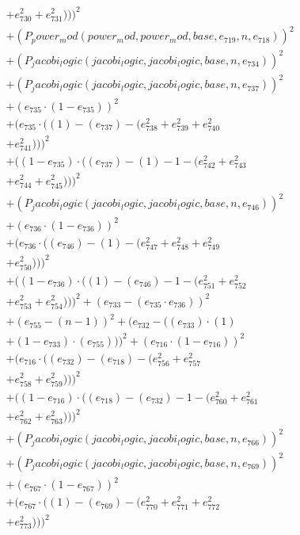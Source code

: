 \documentclass[10pt, a4paper]{article}
\begin{document}
\begin{align*}
& + e_{730}^{2} + e_{731}^{2})))^{2} \\
& + (P_power_mod(power_mod, power_mod, base, e_{719}, n, e_{718}))^{2} \\
& + (P_jacobi_logic(jacobi_logic, jacobi_logic, base, n, e_{734}))^{2} \\
& + (P_jacobi_logic(jacobi_logic, jacobi_logic, base, n, e_{737}))^{2} \\
& + (e_{735}  \cdot  (1 - e_{735}))^{2} \\
& + (e_{735}  \cdot  ((1) - (e_{737}) - (e_{738}^{2} + e_{739}^{2} + e_{740}^{2} \\
& + e_{741}^{2})))^{2} \\
& + ((1 - e_{735})  \cdot  ((e_{737}) - (1) - 1 - (e_{742}^{2} + e_{743}^{2} \\
& + e_{744}^{2} + e_{745}^{2})))^{2} \\
& + (P_jacobi_logic(jacobi_logic, jacobi_logic, base, n, e_{746}))^{2} \\
& + (e_{736}  \cdot  (1 - e_{736}))^{2} \\
& + (e_{736}  \cdot  ((e_{746}) - (1) - (e_{747}^{2} + e_{748}^{2} + e_{749}^{2} \\
& + e_{750}^{2})))^{2} \\
& + ((1 - e_{736})  \cdot  ((1) - (e_{746}) - 1 - (e_{751}^{2} + e_{752}^{2} \\
& + e_{753}^{2} + e_{754}^{2})))^{2} + (e_{733} - (e_{735}  \cdot  e_{736}))^{2} \\
& + (e_{755} - (n - 1))^{2} + (e_{732} - ((e_{733})  \cdot  (1) \\
& + (1 - e_{733})  \cdot  (e_{755})))^{2} + (e_{716}  \cdot  (1 - e_{716}))^{2} \\
& + (e_{716}  \cdot  ((e_{732}) - (e_{718}) - (e_{756}^{2} + e_{757}^{2} \\
& + e_{758}^{2} + e_{759}^{2})))^{2} \\
& + ((1 - e_{716})  \cdot  ((e_{718}) - (e_{732}) - 1 - (e_{760}^{2} + e_{761}^{2} \\
& + e_{762}^{2} + e_{763}^{2})))^{2} \\
& + (P_jacobi_logic(jacobi_logic, jacobi_logic, base, n, e_{766}))^{2} \\
& + (P_jacobi_logic(jacobi_logic, jacobi_logic, base, n, e_{769}))^{2} \\
& + (e_{767}  \cdot  (1 - e_{767}))^{2} \\
& + (e_{767}  \cdot  ((1) - (e_{769}) - (e_{770}^{2} + e_{771}^{2} + e_{772}^{2} \\
& + e_{773}^{2})))^{2} \\

\end{align*}
\end{document}
